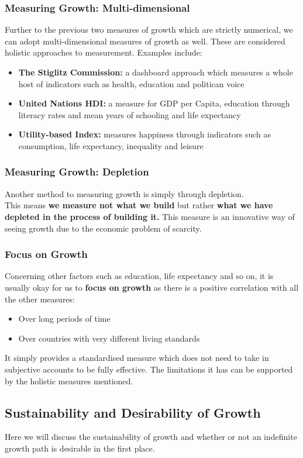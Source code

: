 \documentclass[12pt, letterpaper]{article}
\begin{document}
\subsubsection{Measuring Growth: Multi-dimensional}
Further to the previous two measures of growth which are strictly numerical, we can adopt multi-dimensional measures of growth as well. These are considered holistic approaches to measurement. Examples include:
\begin{itemize}
	\item \textbf{The Stiglitz Commission:} a dashboard approach which measures a whole host of indicators such as health, education and politican voice
	\item \textbf{United Nations HDI:} a measure for GDP per Capita, education through literacy rates and mean years of schooling and life expectancy
	\item \textbf{Utility-based Index:} measures happiness through indicators such as  consumption, life expectancy, inequality and leisure
\end{itemize}

\subsubsection{Measuring Growth: Depletion}
Another method to measuring growth is simply through depletion. \\
This means \textbf{we measure not what we build} but rather \textbf{what we have depleted in the process of building it.} This measure is an innovative way of seeing growth due to the economic problem of scarcity.

\subsubsection{Focus on Growth}
Concerning other factors such as education, life expectancy and so on, it is usually okay for us to \textbf{focus on growth} as there is a positive correlation with all the other measures:
\begin{itemize}
	\item Over long periods of time
	\item Over countries with very different living standards
\end{itemize}
It simply provides a standardised measure which does not need to take in subjective accounts to be fully effective. The limitations it has can be supported by the holistic measures mentioned.

\subsection{Sustainability and Desirability of Growth}
Here we will discuss the sustainability of growth and whether or not an indefinite growth path is desirable in the first place.
\end{document}
